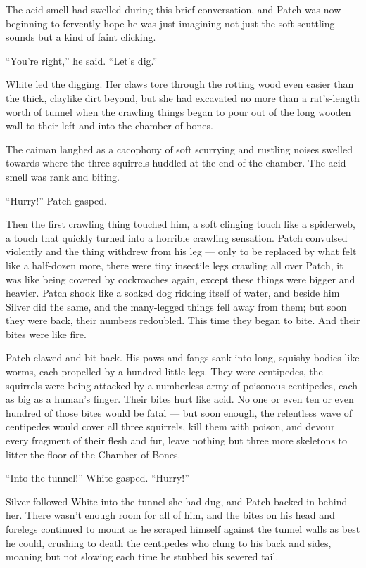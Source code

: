 \documentclass[ebook,oneside,openany,17pt]{memoir}
\newenvironment{tolerant}[1]{%
  \par\tolerance=#1\relax
}{%
  \par
}
\begin{document}
The acid smell had swelled during this brief conversation, and Patch
was now beginning to fervently hope he was just imagining not just the
soft scuttling sounds but a kind of faint clicking.

“You’re right,” he said. “Let’s dig.”

White led the digging. Her claws tore through the rotting wood even
easier than the thick, claylike dirt beyond, but she had excavated no
more than a rat’s-length worth of tunnel when the crawling things
began to pour out of the long wooden wall to their left and into the
chamber of bones.

The caiman laughed as a cacophony of soft scurrying and rustling
noises swelled towards where the three squirrels huddled at the end of
the chamber. The acid smell was rank and biting.

“Hurry!” Patch gasped.

Then the first crawling thing touched him, a soft clinging touch like
a spiderweb, a touch that quickly turned into a horrible crawling
sensation. Patch convulsed violently and the thing withdrew from his
leg — only to be replaced by what felt like a half-dozen more, there
were tiny insectile legs crawling all over Patch, it was like being
covered by cockroaches again, except these things were bigger and
heavier. Patch shook like a soaked dog ridding itself of water, and
beside him Silver did the same, and the many-legged things fell away
from them; but soon they were back, their numbers redoubled. This time
they began to bite. And their bites were like fire.

\begin{tolerant}{500}
Patch clawed and bit back. His paws and fangs sank into long, squishy
bodies like worms, each propelled by a hundred little legs. They were
centipedes, the squirrels were being attacked by a numberless army of
poisonous centipedes, each as big as a human’s finger. Their bites
hurt like acid. No one or even ten or even hundred of those bites
would be fatal — but soon enough, the relentless wave of centipedes
would cover all three squirrels, kill them with poison, and devour
every fragment of their flesh and fur, leave nothing but three more
skeletons to litter the floor of the Chamber of Bones.
\end{tolerant}

“Into the tunnel!” White gasped. “Hurry!”

Silver followed White into the tunnel she had dug, and Patch backed in
behind her. There wasn’t enough room for all of him, and the bites on
his head and forelegs continued to mount as he scraped himself against
the tunnel walls as best he could, crushing to death the centipedes
who clung to his back and sides, moaning but not slowing each time he
stubbed his severed tail.
\end{document}
